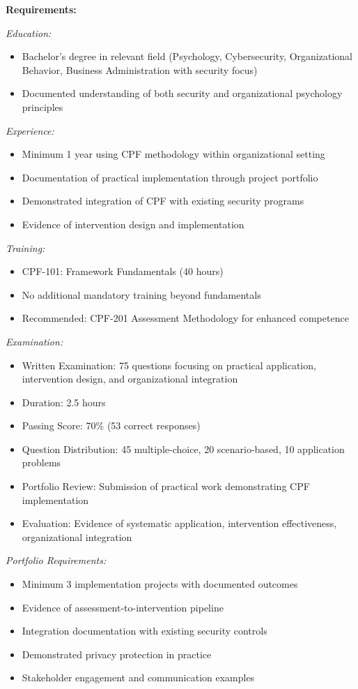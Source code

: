 \documentclass[11pt,a4paper]{article}
\begin{document}
\textbf{Requirements:}

\textit{Education:}
\begin{itemize}
\item Bachelor's degree in relevant field (Psychology, Cybersecurity, Organizational Behavior, Business Administration with security focus)
\item Documented understanding of both security and organizational psychology principles
\end{itemize}

\textit{Experience:}
\begin{itemize}
\item Minimum 1 year using CPF methodology within organizational setting
\item Documentation of practical implementation through project portfolio
\item Demonstrated integration of CPF with existing security programs
\item Evidence of intervention design and implementation
\end{itemize}

\textit{Training:}
\begin{itemize}
\item CPF-101: Framework Fundamentals (40 hours)
\item No additional mandatory training beyond fundamentals
\item Recommended: CPF-201 Assessment Methodology for enhanced competence
\end{itemize}

\textit{Examination:}
\begin{itemize}
\item Written Examination: 75 questions focusing on practical application, intervention design, and organizational integration
\item Duration: 2.5 hours
\item Passing Score: 70\% (53 correct responses)
\item Question Distribution: 45 multiple-choice, 20 scenario-based, 10 application problems
\item Portfolio Review: Submission of practical work demonstrating CPF implementation
\item Evaluation: Evidence of systematic application, intervention effectiveness, organizational integration
\end{itemize}

\textit{Portfolio Requirements:}
\begin{itemize}
\item Minimum 3 implementation projects with documented outcomes
\item Evidence of assessment-to-intervention pipeline
\item Integration documentation with existing security controls
\item Demonstrated privacy protection in practice
\item Stakeholder engagement and communication examples
\end{itemize}
\end{document}

